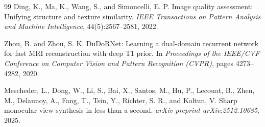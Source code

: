 \documentclass[10pt,twocolumn,letterpaper,bold]{article}
\begin{document}
\begin{thebibliography}{99}
Ding, K., Ma, K., Wang, S., and Simoncelli, E. P.
\newblock Image quality assessment: Unifying structure and texture similarity.
\newblock \emph{IEEE Transactions on Pattern Analysis and Machine Intelligence}, 44(5):2567--2581, 2022.

Zhou, B. and Zhou, S. K.
\newblock DuDoRNet: Learning a dual-domain recurrent network for fast MRI reconstruction with deep T1 prior.
\newblock In \emph{Proceedings of the IEEE/CVF Conference on Computer Vision and Pattern Recognition (CVPR)}, pages 4273--4282, 2020.

Mescheder, L., Dong, W., Li, S., Bai, X., Santos, M., Hu, P., Lecouat, B., Zhen, M., Delaunoy, A., Fang, T., Tsin, Y., Richter, S. R., and Koltun, V.
\newblock Sharp monocular view synthesis in less than a second.
\newblock \emph{arXiv preprint arXiv:2512.10685}, 2025.

\end{thebibliography}

% 
% 
\end{document}
